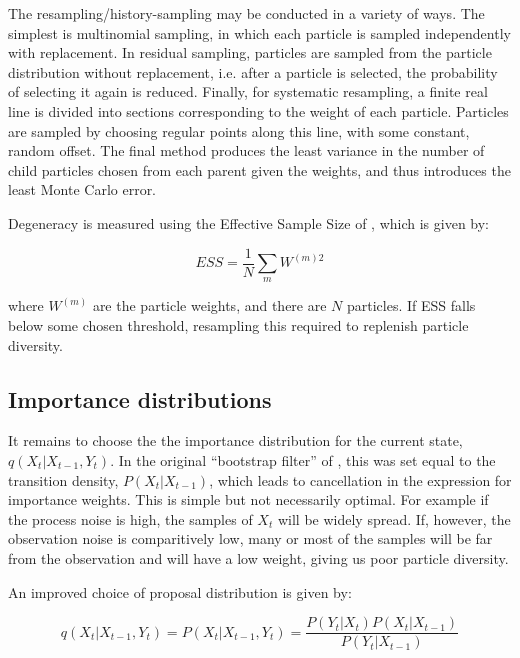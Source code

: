 The resampling/history-sampling may be conducted in a variety of ways. The simplest is multinomial sampling, in which each particle is sampled independently with replacement. In residual sampling, particles are sampled from the particle distribution without replacement, i.e. after a particle is selected, the probability of selecting it again is reduced. Finally, for systematic resampling, a finite real line is divided into sections corresponding to the weight of each particle. Particles are sampled by choosing regular points along this line, with some constant, random offset. The final method produces the least variance in the number of child particles chosen from each parent given the weights, and thus introduces the least Monte Carlo error.

Degeneracy is measured using the Effective Sample Size of \cite{Liu1995}, which is given by:

\begin{equation}
ESS = \frac{1}{N} \sum_m W^{(m)2}
\label{eq:ESS}
\end{equation}

where $W^{(m)}$ are the particle weights, and there are $N$ particles. If ESS falls below some chosen threshold, resampling this required to replenish particle diversity.



\subsection{Importance distributions}

It remains to choose the the importance distribution for the current state, $q(X_{t}|X_{t-1}, Y_{t})$. In the original ``bootstrap filter'' of \cite{Gordon1993}, this was set equal to the transition density, $P(X_t|X_{t-1})$, which leads to cancellation in the expression for importance weights. This is simple but not necessarily optimal. For example if the process noise is high, the samples of $X_t$ will be widely spread. If, however, the observation noise is comparitively low, many or most of the samples will be far from the observation and will have a low weight, giving us poor particle diversity.

An improved choice of proposal distribution is given by:

\begin{equation}
q(X_{t}|X_{t-1}, Y_{t}) = P(X_t|X_{t-1}, Y_t) = \frac{P(Y_t|X_t)P(X_t|X_{t-1})}{P(Y_t|X_{t-1})}
\label{eq:OptimalImportanceDist}
\end{equation}

